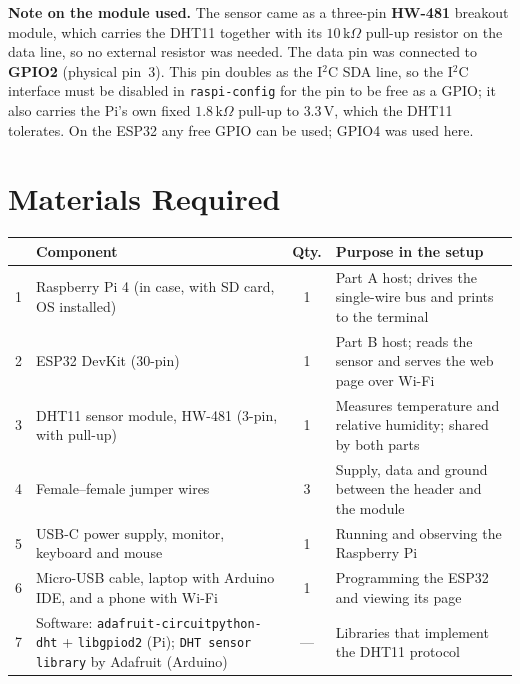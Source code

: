 \documentclass[10pt,a4paper]{article}
\begin{document}
\begin{notebox}
\textbf{Note on the module used.} The sensor came as a three-pin \textbf{HW-481}
breakout module, which carries the DHT11 together with its $10\,\mathrm{k}\Omega$ pull-up
resistor on the data line, so no external resistor was needed. The data pin was
connected to \textbf{GPIO2} (physical pin~3). This pin doubles as the I$^2$C SDA line,
so the I$^2$C interface must be disabled in \texttt{raspi-config} for the pin to be free
as a GPIO; it also carries the Pi's own fixed $1.8\,\mathrm{k}\Omega$ pull-up to
$3.3\,\mathrm{V}$, which the DHT11 tolerates. On the ESP32 any free GPIO can be used;
GPIO4 was used here.
\end{notebox}

\section{Materials Required}

\noindent
\begin{tabularx}{\textwidth}{@{}p{0.4cm} >{\raggedright\arraybackslash}p{5.6cm} c X@{}}
\toprule
\rowcolor{soft}
\multicolumn{1}{@{}l}{\textbf{\#}} & \textbf{Component} & \textbf{Qty.} & \textbf{Purpose in the setup} \\
\midrule
1 & Raspberry Pi 4 (in case, with SD card, OS installed) & 1 & Part A host; drives the single-wire bus and prints to the terminal \\
2 & ESP32 DevKit (30-pin)                                  & 1 & Part B host; reads the sensor and serves the web page over Wi-Fi \\
3 & DHT11 sensor module, HW-481 (3-pin, with pull-up)  & 1 & Measures temperature and relative humidity; shared by both parts \\
4 & Female--female jumper wires                           & 3 & Supply, data and ground between the header and the module \\
5 & USB-C power supply, monitor, keyboard and mouse       & 1 & Running and observing the Raspberry Pi \\
6 & Micro-USB cable, laptop with Arduino IDE, and a phone with Wi-Fi & 1 & Programming the ESP32 and viewing its page \\
7 & Software: \texttt{adafruit-circuitpython-dht} + \texttt{libgpiod2} (Pi); \texttt{DHT sensor library} by Adafruit (Arduino) & --- & Libraries that implement the DHT11 protocol \\
\bottomrule
\end{tabularx}
\end{document}
